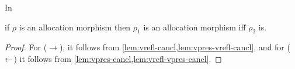 \begin{lemma}\label{lem:alloc-cancl}
    In 
    if $\rho$ is an allocation morphism then $\rho_1$ is an allocation morphism iff $\rho_2$ is.
\end{lemma}
\begin{proof}
    For ($\to$), it follows from \cref{lem:vrefl-cancl,lem:vpres-vrefl-cancl}, and for ($\leftarrow$) it follows from \cref{lem:vpres-cancl,lem:vrefl-vpres-cancl}.
\end{proof}

